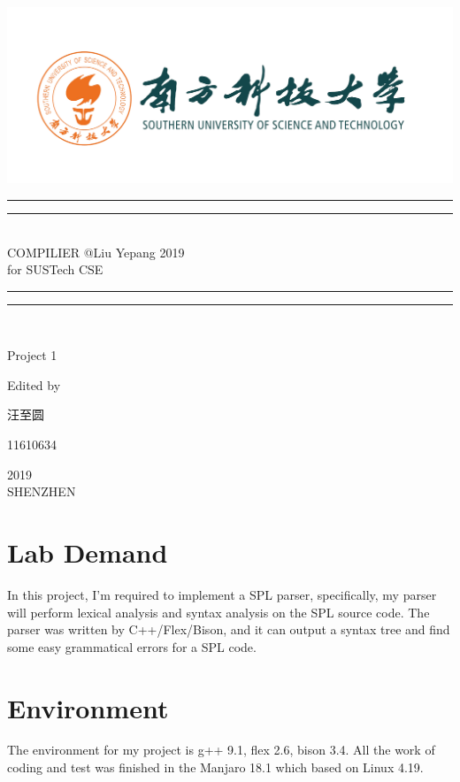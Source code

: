 \documentclass{article}
\begin{document}
 
    \begin{titlepage}       %
        \centering
        \includegraphics[width=\textwidth]{../SUSTC_LOGO.png}
        \rule{\textwidth}{1.6pt}\vspace*{-\baselineskip}\vspace*{2pt}
        \rule{\textwidth}{0.4pt}\\[\baselineskip]
        {\LARGE COMPILIER @Liu Yepang 2019\\[\baselineskip]\small for SUSTech CSE}
        \\[0.2\baselineskip]
        \rule{\textwidth}{0.4pt}\vspace*{-\baselineskip}\vspace{3.2pt}
        \rule{\textwidth}{1.6pt}\\[\baselineskip]
        \scshape
        \vspace*{\baselineskip}
        {\Large Project 1\par }
        Edited by \\[\baselineskip] {汪至圆\par}
        {\Large 11610634\par }
        \vfill
        {\scshape 2019} \\{\large SHENZHEN}\par
    \end{titlepage}

    \section{Lab Demand}
        In this project, I'm required to implement a SPL parser, specifically, my parser
        will perform lexical analysis and syntax analysis on the SPL source code. The parser was
        written by C++/Flex/Bison, and it can output a syntax tree and find some easy grammatical 
        errors for a SPL code.

    \section{Environment}
        The environment for my project is g++ 9.1, flex 2.6, bison 3.4. All the work of coding
        and test was finished in the Manjaro 18.1 which based on Linux 4.19.
\end{document}
